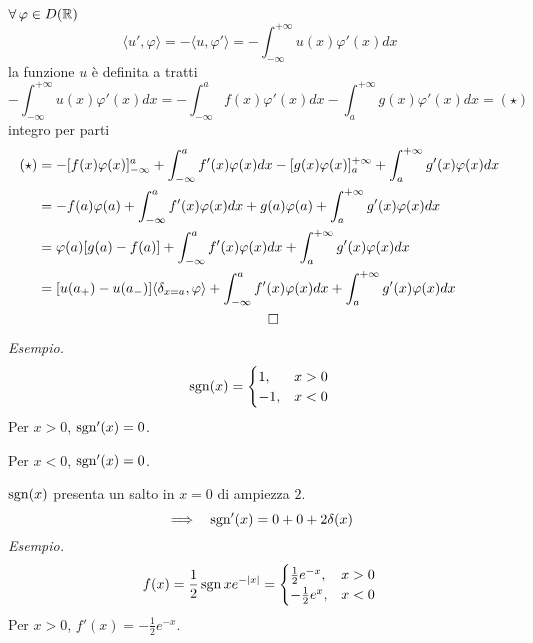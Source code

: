 $\forall \varphi \in D(\RR)$
\begin{equation*}
\langle u', \varphi \rangle = - \langle u, \varphi '\rangle = - \int^{+ \infty}_{- \infty} u(x) \varphi '(x) dx
\end{equation*}
la funzione $u$ è definita a tratti
\begin{equation*}
- \int^{+ \infty}_{- \infty} u(x) \varphi '(x) dx = -\int^{a}_{- \infty} f(x) \varphi '(x) dx - \int^{+ \infty}_{a} g(x) \varphi '(x) dx = (\star)
\end{equation*}
integro per parti
\begin{gather*}
\begin{aligned}
(\star) & = - [ f(x) \varphi (x)]^{a}_{- \infty} + \int^{a}_{- \infty} f'(x) \varphi (x) dx - [ g(x) \varphi (x)]^{+ \infty}_{a} + \int^{+ \infty}_{a} g'(x) \varphi (x) dx\\
 & = - f(a) \varphi (a) + \int^{a}_{- \infty} f'(x) \varphi (x) dx + g(a) \varphi (a) + \int^{+ \infty}_{a} g'(x) \varphi (x) dx\\
 & = \varphi (a)[ g(a) - f(a)] + \int^{a}_{- \infty} f'(x) \varphi (x) dx + \int^{+ \infty}_{a} g'(x) \varphi (x) dx\\
 & = [ u(a_{+}) - u(a_{-})] \langle \delta_{x = a}, \varphi \rangle + \int^{a}_{- \infty} f'(x) \varphi (x) dx + \int^{+ \infty}_{a} g'(x) \varphi (x) dx
\end{aligned}\\
\qed
\end{gather*}
\textit{Esempio.}
\begin{equation*}
\operatorname{sgn}(x) =
\begin{cases}
1, & x > 0\\
- 1, & x < 0
\end{cases}
\end{equation*}
Per $x > 0$, $\operatorname{sgn} '(x) = 0$.

Per $x < 0$, $\operatorname{sgn} '(x) = 0$.

$\operatorname{sgn}(x)$ presenta un salto in $x = 0$ di ampiezza $2$.
\begin{equation*}
\implies \ \ \operatorname{sgn} '(x) = 0 + 0 + 2\delta (x)
\end{equation*}
\textit{Esempio.}
\begin{equation*}
f(x) = \frac{1}{2}\operatorname{sgn} xe^{- | x|} =
\begin{cases}
\frac{1}{2} e^{- x}, & x > 0\\
- \frac{1}{2} e^{x}, & x < 0
\end{cases}
\end{equation*}
Per $x > 0$, $f'(x) = - \frac{1}{2} e^{- x}$.

